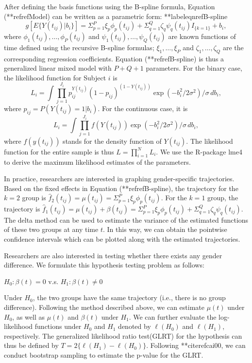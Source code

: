 After defining the basis functions using the B-spline formula,
Equation (**refref{Model}) can be written as a parametric form:
**labeleqnref{B-spline}
\begin{equation}
g[E\{Y(t_{ij})|b_{i}\}]=\Sigma_{p=1}^{P}\xi_{p}\phi_{p}(t_{ij})+\Sigma_{q=1}^{Q}\zeta_{q}\psi_{q}(t_{ij})I_{\{k=1\}}+b_i,
\end{equation}
where $\phi_{1}(t_{ij}),\ldots,\phi_{P}(t_{ij})$ and
$\psi_{1}(t_{ij}),\ldots,\psi_{Q}(t_{ij})$ are known functions of
time defined using the recursive B-spline formulas;
$\xi_1,\ldots,\xi_P$ and $\zeta_1,\ldots,\zeta_Q$ are the
corresponding regression coefficients. Equation (**refref{B-spline})
is thus a generalized linear mixed model with $P+Q+1$ parameters.
For the binary case, the likelihood function for Subject $i$ is
$$
L_{i}=\int\prod_{j=1}^{J_{i}}
p_{ij}^{Y(t_{ij})}(1-p_{ij})^{(1-Y(t_{ij}))}
\exp(-b_i^2/2\sigma^2)/\sigma\,d b_i,
$$
where $p_{ij}=P(Y(t_{ij})=1|b_i)$.
For the continuous case, it is
$$
L_{i}=\int\prod_{j=1}^{J_{i}}f(Y(t_{ij}))\exp(-b_i^2/2\sigma^2)/\sigma\,d
b_i,
$$
where $f(y(t_{ij}))$ stands for the density function of
$Y(t_{ij})$. The likelihood function for the entire sample is thus
$L=\prod_{i=1}^{N}L_{i}$. We use the R-package lme4 to derive the
maximum likelihood estimates of the parameters.

In practice, researchers are interested in graphing
gender-specific trajectories. Based on the fixed effects in
Equation (**refref{B-spline}), the trajectory for the $k=2$ group is
$\hat{f}_{2}(t_{ij})=\mu(t_{ij})=\Sigma_{p=1}^{P}\xi_{p}\phi_{p}(t_{ij})$.
For the $k=1$ group, the trajectory is
$\hat{f}_{1}(t_{ij})=\mu(t_{ij})+\beta(t_{ij})=\Sigma_{p=1}^{P}\xi_{p}\phi_{p}(t_{ij})+\Sigma_{q=1}^{Q}\zeta_{q}\psi_{q}(t_{ij})$.
The delta method can be used to estimate the variance of the
estimated functions of these two groups at any time $t$. In this
way, we can obtain the pointwise confidence intervals which can be
plotted along with the estimated trajectories.

Researchers are also interested in testing whether there exists
any gender difference. We formulate this hypothesis testing
problem as follows:
\begin{center}
$H_{0}: \beta(t)=0$ v.s. $H_{1}: \beta(t)\neq0$
\end{center}
Under $H_{0}$, the two groups have the same trajectory (i.e.,
there is no group difference). Following the method described
above, we can estimate $\mu(t)$ under $H_{0}$, as well as $\mu(t)$
and $\beta(t)$ under $H_{1}$. We can further evaluate the
log-likelihood functions under $H_{0}$ and $H_{1}$ denoted by
$\ell(H_{0})$ and $\ell(H_{1})$, respectively. The generalized
likelihood ratio test(GLRT) for the hypothesis can thus be defined
by $T=2\{\ell(H_{1})-\ell(H_{0})\}$. Following **citeref{cai00}, we
can conduct bootstrap sampling to estimate the p-value for the
GLRT.


